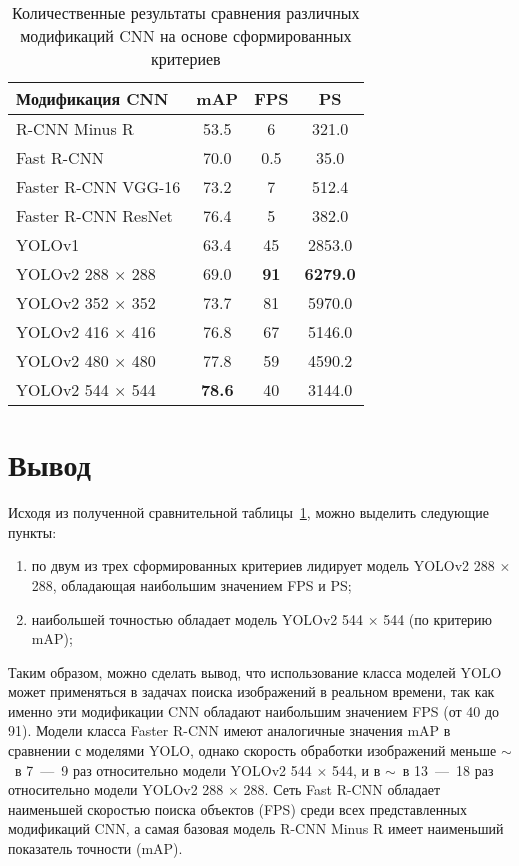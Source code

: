 \clearpage
\begin{table}[!ht]
	\centering
	\caption{\label{table1} Количественные результаты сравнения различных модификаций CNN на основе сформированных критериев}
	\begin{tabularx}{\textwidth}{|X|c|c|c|}
		\hline
		Модификация CNN & mAP & FPS & PS \\ \hline
		R-CNN Minus R & 53.5 & 6 & 321.0 \\ \hline
		Fast R-CNN & 70.0 & 0.5 & 35.0 \\ \hline
		Faster R-CNN VGG-16 & 73.2 & 7 & 512.4 \\ \hline
		Faster R-CNN ResNet & 76.4 & 5 & 382.0 \\ \hline
		YOLOv1 & 63.4 & 45 & 2853.0 \\ \hline
		YOLOv2 288 $\times$ 288 & 69.0 & \textbf{91} & \textbf{6279.0} \\ \hline
		YOLOv2 352 $\times$ 352 & 73.7 & 81 & 5970.0 \\ \hline
		YOLOv2 416 $\times$ 416 & 76.8 & 67 & 5146.0 \\ \hline
		YOLOv2 480 $\times$ 480 & 77.8 & 59 & 4590.2 \\ \hline
		YOLOv2 544 $\times$ 544 & \textbf{78.6} & 40 & 3144.0 \\ \hline
	\end{tabularx}
\end{table}

\section*{Вывод}

Исходя из полученной сравнительной таблицы~\ref{table1}, можно выделить следующие пункты:
\begin{enumerate}
	\item по двум из трех сформированных критериев лидирует модель YOLOv2 288 $\times$ 288, обладающая наибольшим значением FPS и PS;
	\item наибольшей точностью обладает модель YOLOv2 544 $\times$ 544 (по критерию mAP);
\end{enumerate}

Таким образом, можно сделать вывод, что использование класса моделей YOLO может применяться в задачах поиска изображений в реальном времени, так как именно эти модификации CNN обладают наибольшим значением FPS (от 40 до 91).
Модели класса Faster R-CNN имеют аналогичные значения mAP в сравнении с моделями YOLO, однако скорость обработки изображений меньше $\sim$~в  7~---~9 раз относительно модели YOLOv2 544 $\times$ 544, и в $\sim$~в  13~---~18 раз относительно модели YOLOv2 288 $\times$ 288.
Сеть Fast R-CNN обладает наименьшей скоростью поиска объектов (FPS) среди всех представленных модификаций CNN, а самая базовая модель R-CNN Minus R имеет наименьший показатель точности (mAP).